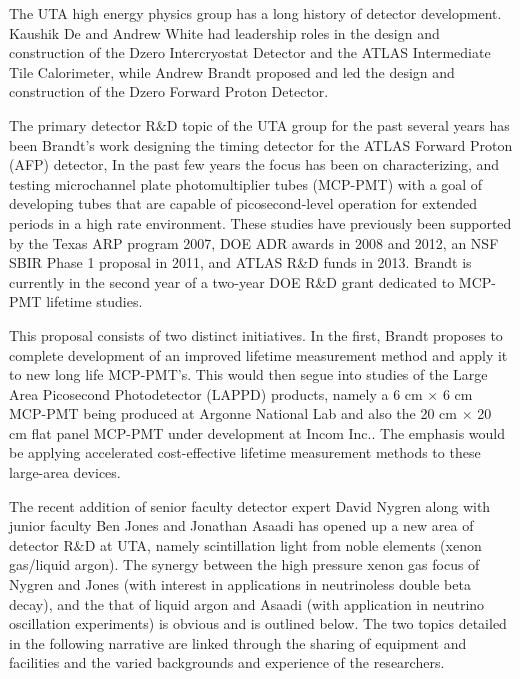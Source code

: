 The UTA high energy physics group has a long history of detector development. Kaushik De and Andrew White had leadership roles in the design and construction of the Dzero Intercryostat Detector  and the ATLAS Intermediate Tile Calorimeter,  while Andrew Brandt proposed and led the design and construction of the Dzero Forward Proton Detector.

The primary detector R$\&$D topic of the UTA group for the past several years has been Brandt's work designing the timing detector for the ATLAS Forward Proton (AFP) detector, In the past few years the focus has been on characterizing, and testing microchannel plate photomultiplier tubes (MCP-PMT) with a goal of developing tubes that are capable of picosecond-level operation for extended periods in a high rate environment. These studies have previously been supported by the Texas ARP program 2007, DOE ADR awards in 2008 and 2012, an NSF SBIR Phase 1 proposal in 2011, and ATLAS R\&D funds in 2013. Brandt is currently in the second year of a two-year DOE R\&D grant dedicated to MCP-PMT lifetime studies.  

This proposal consists of two distinct initiatives. In the first, Brandt proposes to complete development of an improved lifetime measurement method and apply it to new long life MCP-PMT's. This would then segue into studies of the Large Area Picosecond Photodetector (LAPPD)\cite{LAPPD} products, namely a  6 cm $\times$ 6 cm MCP-PMT being produced at Argonne National Lab and also the 20 cm $\times$ 20 cm flat panel MCP-PMT under development at Incom Inc.\cite{incom}. The emphasis would be applying accelerated cost-effective lifetime measurement methods to these large-area devices.

The recent addition of senior faculty detector expert David Nygren along with junior faculty Ben Jones and Jonathan Asaadi has opened up a new area of detector R$\&$D at UTA, namely scintillation light from noble elements (xenon gas/liquid argon). The synergy between the high pressure xenon gas focus of Nygren and Jones (with interest in applications in neutrinoless double beta decay), and the that of liquid argon and Asaadi (with application in neutrino oscillation experiments) is obvious and is outlined below.  The two topics detailed in the following narrative are linked through the sharing of equipment and facilities and the varied backgrounds and experience of the researchers.